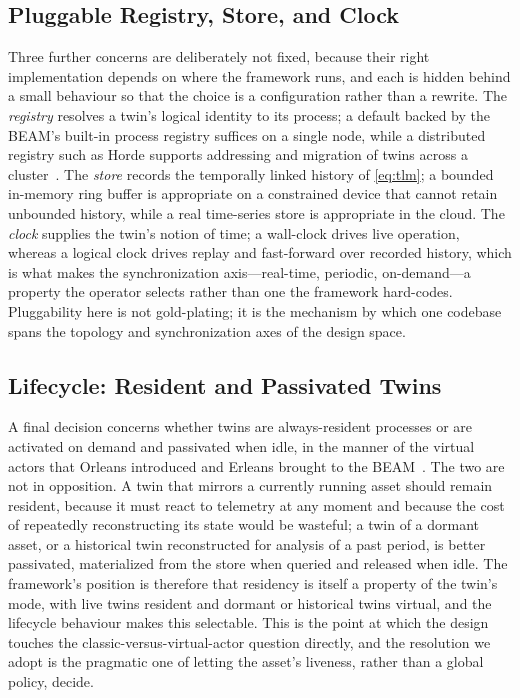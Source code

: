 \documentclass[conference]{IEEEtran}
\newcommand{\beam}{BEAM\xspace}
\begin{document}
\subsection{Pluggable Registry, Store, and Clock}
Three further concerns are deliberately not fixed, because their right
implementation depends on where the framework runs, and each is hidden behind a
small behaviour so that the choice is a configuration rather than a rewrite. The
\emph{registry} resolves a twin's logical identity to its process; a default
backed by the \beam's built-in process registry suffices on a single node, while
a distributed registry such as Horde supports addressing and migration of twins
across a cluster~\cite{horde,partisan}. The \emph{store} records the temporally
linked history of \eqref{eq:tlm}; a bounded in-memory ring buffer is appropriate
on a constrained device that cannot retain unbounded history, while a real
time-series store is appropriate in the cloud. The \emph{clock} supplies the
twin's notion of time; a wall-clock drives live operation, whereas a logical
clock drives replay and fast-forward over recorded history, which is what makes
the synchronization axis---real-time, periodic, on-demand---a property the
operator selects rather than one the framework hard-codes. Pluggability here is
not gold-plating; it is the mechanism by which one codebase spans the topology
and synchronization axes of the design space.

\subsection{Lifecycle: Resident and Passivated Twins}
A final decision concerns whether twins are always-resident processes or are
activated on demand and passivated when idle, in the manner of the virtual
actors that Orleans introduced and Erleans brought to the
\beam~\cite{orleans,erleans}. The two are not in opposition. A twin that mirrors
a currently running asset should remain resident, because it must react to
telemetry at any moment and because the cost of repeatedly reconstructing its
state would be wasteful; a twin of a dormant asset, or a historical twin
reconstructed for analysis of a past period, is better passivated, materialized
from the store when queried and released when idle. The framework's position is
therefore that residency is itself a property of the twin's mode, with live
twins resident and dormant or historical twins virtual, and the lifecycle
behaviour makes this selectable. This is the point at which the design touches
the classic-versus-virtual-actor question directly, and the resolution we adopt
is the pragmatic one of letting the asset's liveness, rather than a global
policy, decide.
\end{document}
